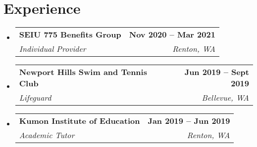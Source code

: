 \documentclass[letterpaper,11pt]{article}
\makeatletter
\newcommand{\resumeSubheading}[4]{
  \vspace{-2pt}\item
    \begin{tabular*}{1.0\textwidth}[t]{l@{\extracolsep{\fill}}r}
      \textbf{#1} & \textbf{\small #2} \\
      \textit{\small#3} & \textit{\small #4} \\
    \end{tabular*}\vspace{-7pt}
}
\newcommand{\resumeSubHeadingListStart}{\begin{itemize}[leftmargin=0.0in, label={}]}
\newcommand{\resumeSubHeadingListEnd}{\end{itemize}}
\makeatother
\begin{document}
\section{Experience}
  \resumeSubHeadingListStart

    \resumeSubheading
      {SEIU 775 Benefits Group}{Nov 2020 -- Mar 2021}
      {Individual Provider}{Renton, WA}

    \resumeSubheading
      {Newport Hills Swim and Tennis Club}{Jun 2019 -- Sept 2019}
      {Lifeguard}{Bellevue, WA}

    \resumeSubheading
      {Kumon Institute of Education}{Jan 2019 -- Jun 2019}
      {Academic Tutor}{Renton, WA}
    
  \resumeSubHeadingListEnd
\vspace{-16pt}
 
\end{document}
